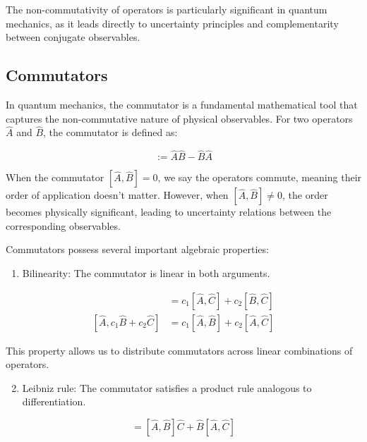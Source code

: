 \documentclass[italian]{HKNdocument}
\begin{document}
The non-commutativity of operators is particularly significant in quantum mechanics, as it leads directly to uncertainty principles and complementarity between conjugate observables.


\subsection{Commutators}

In quantum mechanics, the commutator is a fundamental mathematical tool that captures the non-commutative nature of physical observables. For two operators $\hat{A}$ and $\hat{B}$, the commutator is defined as:

\begin{equation}
[\hat{A}, \hat{B}] := \hat{A}\hat{B} - \hat{B}\hat{A} \label{eq:1.52}
\end{equation}

When the commutator $[\hat{A}, \hat{B}] = 0$, we say the operators commute, meaning their order of application doesn't matter. However, when $[\hat{A}, \hat{B}] \neq 0$, the order becomes physically significant, leading to uncertainty relations between the corresponding observables.

Commutators possess several important algebraic properties:

\begin{enumerate}
  \item Bilinearity: The commutator is linear in both arguments.
\end{enumerate}

\begin{align}
[c_{1}\hat{A} + c_{2}\hat{B}, \hat{C}] &= c_{1}[\hat{A}, \hat{C}] + c_{2}[\hat{B}, \hat{C}] \\
[\hat{A}, c_{1}\hat{B} + c_{2}\hat{C}] &= c_{1}[\hat{A}, \hat{B}] + c_{2}[\hat{A}, \hat{C}] \label{eq:1.53}
\end{align}

This property allows us to distribute commutators across linear combinations of operators.

\begin{enumerate}
  \setcounter{enumi}{1}
  \item Leibniz rule: The commutator satisfies a product rule analogous to differentiation.
\end{enumerate}

\begin{equation}
[\hat{A}, \hat{B}\hat{C}] = [\hat{A}, \hat{B}]\hat{C} + \hat{B}[\hat{A}, \hat{C}] \label{eq:1.54}
\end{equation}
\end{document}
